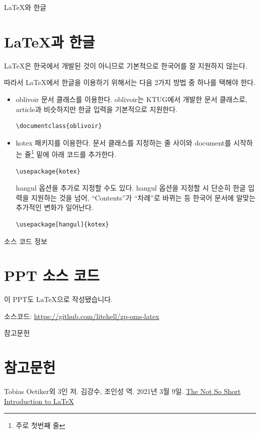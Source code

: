 \documentclass{beamer}
\begin{document}
\begin{frame}{\LaTeX{}와 한글}
    \section{\LaTeX{}과 한글}
    \LaTeX{}은 한국에서 개발된 것이 아니므로 기본적으로 한국어를 잘 지원하지 않는다.

    따라서 \LaTeX{}에서 한글을 이용하기 위해서는 다음 2가지 방법 중 하나를 택해야 한다.

    \begin{itemize}
        \item oblivoir 문서 클래스를 이용한다. oblivoir는 KTUG에서 개발한 문서 클래스로, article과 비슷하지만 한글 입력을 기본적으로 지원한다.
        
        \begin{lstlisting}[numbers=none]
\documentclass{oblivoir}
        \end{lstlisting}

        \item kotex 패키지를 이용한다. 문서 클래스를 지정하는 줄 사이와 document를 시작하는 줄\footnote{주로 첫번째 줄} 밑에 아래 코드를 추가한다.
        \begin{lstlisting}[numbers=none]
\usepackage{kotex}
        \end{lstlisting}

        \framebreak
        hangul 옵션을 추가로 지정할 수도 있다. hangul 옵션을 지정할 시 단순히 한글 입력을 지원하는 것을 넘어, ``Contents''가 ``차례''로 바뀌는 등 한국어 문서에 알맞는 추가적인 변화가 일어난다.
        \begin{lstlisting}[numbers=none]
\usepackage[hangul]{kotex}
        \end{lstlisting}
    \end{itemize}
\end{frame}

\begin{frame}{소스 코드 정보}
    \section{PPT 소스 코드}
    이 PPT도 \LaTeX{}으로 작성됐습니다.
    
    소스코드: \url{https://github.com/litehell/zp-oms-latex}
\end{frame}

\begin{frame}{참고문헌}
    \section{참고문헌}
    \begin{thebibliography}{10}
         Tobias Oetiker외 3인 저. 김강수, 조인성 역. 2021년 3월 9일. \href{https://lab.uklee.pe.kr/tex-archive/info/lshort/korean/lshort-ko.pdf}{The Not So Short Introduction to \LaTeX{}}
    \end{thebibliography}
\end{frame}
\end{document}

